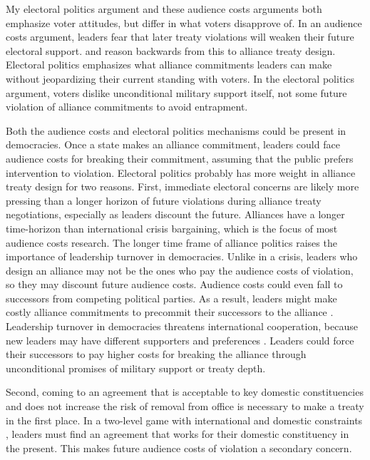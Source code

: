 \documentclass[12pt]{article}
\begin{document}
My electoral politics argument and these audience costs arguments both emphasize voter attitudes, but differ in what voters disapprove of.  
In an audience costs argument, leaders fear that later treaty violations will weaken their future electoral support. and reason backwards from this to alliance treaty design. 
Electoral politics emphasizes what alliance commitments leaders can make without jeopardizing their current standing with voters. 
In the electoral politics argument, voters dislike unconditional military support itself, not some future violation of alliance commitments to avoid entrapment. 
    

Both the audience costs and electoral politics mechanisms could be present in democracies. 
Once a state makes an alliance commitment, leaders could face audience costs for breaking their commitment, assuming that the public prefers intervention to violation.  
Electoral politics probably has more weight in alliance treaty design for two reasons.
First, immediate electoral concerns are likely more pressing than a longer horizon of future violations during alliance treaty negotiations, especially as leaders discount the future.  
Alliances have a longer time-horizon than international crisis bargaining, which is the focus of most audience costs research. 
The longer time frame of alliance politics raises the importance of leadership turnover in democracies. 
Unlike in a crisis, leaders who design an alliance may not be the ones who pay the audience costs of violation, so they may discount future audience costs. 
Audience costs could even fall to successors from competing political parties. 
As a result, leaders might make costly alliance commitments to precommit their successors to the alliance \citep{Mattes2012a}. 
Leadership turnover in democracies threatens international cooperation, because new leaders may have different supporters and preferences \citep{Lobell2004, Narizny2007, Leedsetal2009}. 
Leaders could force their successors to pay higher costs for breaking the alliance through unconditional promises of military support or treaty depth. 


Second, coming to an agreement that is acceptable to key domestic constituencies and does not increase the risk of removal from office is necessary to make a treaty in the first place. 
In a two-level game with international and domestic constraints \citep{Putnam1988}, leaders must find an agreement that works for their domestic constituency in the present. 
This makes future audience costs of violation a secondary concern.  
\end{document}
